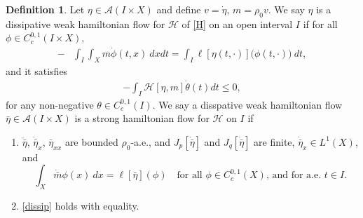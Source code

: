 \documentclass[10pt, letterpaper]{article}
\def\H{{\mathcal{H}}}
\theoremstyle{definition}
\newtheorem{definition}[subsubsection]{Definition}
\theoremstyle{remark}
\begin{document}
\begin{definition} Let $\eta \in \mathcal{A}(I \times X)$ and define ${v}=\dot\eta$, ${m}= \rho_0 {v}$. We say $\eta$ is a dissipative weak hamiltonian flow for $\H$  of \eqref{H} on an open interval $I$ if for all $\phi\in C_c^{0,1}(I \times X)$,
    \begin{equation} \label{wksol}
        \begin{aligned}
         -&\int_I\int_{X}^{}{m}\dot{\phi}(t,x) \: dxdt = \int_I \ell{[\eta(t,\cdot)]}\big(\phi(t,\cdot)\big) \: dt,%
        \end{aligned}
    \end{equation}
and it satisfies
    \begin{equation} \label{dissip}
        \begin{aligned}
        -\int_I \H[\eta, {m}]\dot{\theta}(t)dt \leq 0,
        \end{aligned}
    \end{equation}
    for any non-negative $\theta\in C^{0,1}_c(I)$. 
We say a disspative weak hamiltonian flow $\bar\eta \in \mathcal{A}(I\times X)$ is a strong hamiltonian flow for $\H$ on $I$ if 
\begin{enumerate}
 \item $\ddot{\bar\eta}$, $\dot{\bar{\eta}}_x$, $\bar\eta_{xx}$ are bounded $\rho_0$-a.e., and $J_p[{\dot{\bar\eta}}]$ and $J_q[{\dot{\bar\eta}}]$ are finite, $\dot{\bar{\eta}}_x \in L^1(X)$, and
 \begin{equation}
  \int_X \dot{\bar{{m}}} \phi(x) \: dx = \ell[\bar\eta](\phi) \quad \text{for all $\phi\in C_c^{0,1}(X)$, and for a.e. $t\in I$.}
 \end{equation}
 \item \eqref{dissip} holds with equality.
\end{enumerate}
\end{definition}
\end{document}
